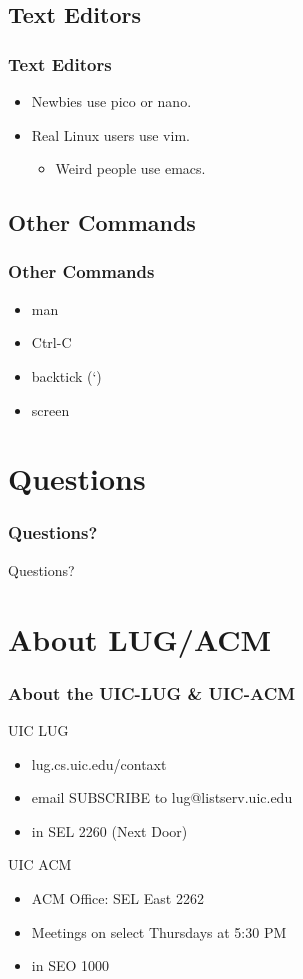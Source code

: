 \documentclass[hyperref={pdfpagelabels=false}]{beamer}
\begin{document}
\subsection{Text Editors}
\frame
{
    \frametitle{Text Editors}
    \begin{itemize}
    \item{Newbies use pico or nano.}
    \item{Real Linux users use vim.}
        \begin{itemize}
        \item{Weird people use emacs.}
        \end{itemize}
    \end{itemize}
}
\subsection{Other Commands}
\frame
{
    \frametitle{Other Commands}
    \begin{itemize}
    \item{man}
    \item{Ctrl-C}
    \item{backtick (`)}
    \item{screen}
    \end{itemize}
}
\section{Questions}
\frame
{
    \frametitle{Questions?}
    Questions?
}
\section{About LUG/ACM}
\frame
{
    \frametitle{About the UIC-LUG \& UIC-ACM}
    UIC LUG
    \begin{itemize}
    \item{lug.cs.uic.edu/contaxt}
    \item{email SUBSCRIBE to lug@listserv.uic.edu}
    \item{in SEL 2260 (Next Door)}
    \end{itemize}
    UIC ACM
    \begin{itemize}
    \item{ACM Office: SEL East 2262}
    \item{Meetings on select Thursdays at 5:30 PM}
    \item{in SEO 1000}
    \end{itemize}
}
\end{document}
